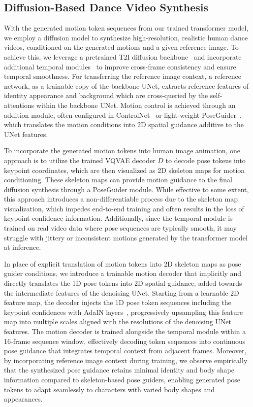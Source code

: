 \subsection{Diffusion-Based Dance Video Synthesis}
\label{sec:diff}
With the generated motion token sequences from our trained transformer model, we employ a diffusion model to synthesize high-resolution, realistic human dance videos, conditioned on the generated motions and a given reference image. To achieve this, we leverage a pretrained T2I diffusion backbone~\cite{rombach2022high} and incorporate additional temporal modules~\cite{guo2023animatediff} to improve cross-frame consistency and ensure temporal smoothness. For transferring the reference image context, a reference network, as a trainable copy of the backbone UNet, extracts reference features of identity appearance and background which are cross-queried by the self-attentions within the backbone UNet. Motion control is achieved through an addition module, often configured in ControlNet~\cite{zhang2023adding} or light-weight PoseGuider~\cite{hu2024animate}, which translates the motion conditions into 2D spatial guidance additive to the UNet features. 

To incorporate the generated motion tokens into human image animation, one approach is to utilize the trained VQVAE decoder
$D$ to decode pose tokens into keypoint coordinates, which are then visualized as 2D skeleton maps for motion conditioning. These skeleton maps can provide motion guidance to the final diffusion synthesis through a PoseGuider module. While effective to some extent, this approach introduces a non-differentiable process due to the skeleton map visualization, which impedes end-to-end training and often results in the loss of keypoint confidence information.
Additionally, since the temporal module is trained on real video data where pose sequences are typically smooth, it may struggle with jittery or inconsistent motions generated by the transformer model at inference.

In place of explicit translation of motion tokens into 2D skeleton maps as pose guider conditions, we introduce a trainable motion decoder that implicitly and directly translates the 1D pose tokens into 2D spatial guidance, added towards the intermediate features of the denoising UNet. Starting from a learnable 2D feature map, the decoder injects the 1D pose token sequences including the keypoint confidences with AdaIN layers~\cite{huang2017arbitrary}, progressively upsampling this feature map into multiple scales aligned with the resolutions of the denoising UNet features.  The motion decoder is trained alongside the temporal module within a 16-frame sequence window, effectively decoding token sequences into continuous pose guidance that integrates temporal context from adjacent frames. Moreover, by incorporating reference image context during training, we observe empirically that the synthesized pose guidance retains minimal identity and body shape information compared to skeleton-based pose guiders, enabling generated pose tokens to adapt seamlessly to characters with varied body shapes and appearances.